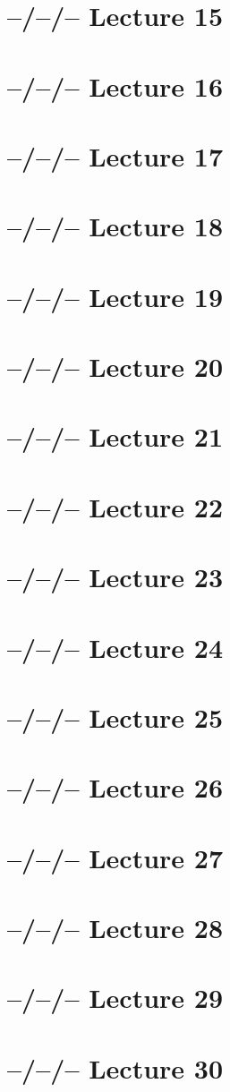 \documentclass{article}
\theoremstyle{definition}
\begin{document}
\section{--/--/-- Lecture 15}

\section{--/--/-- Lecture 16}

\section{--/--/-- Lecture 17}

\section{--/--/-- Lecture 18}

\section{--/--/-- Lecture 19}

\section{--/--/-- Lecture 20}

\section{--/--/-- Lecture 21}

\section{--/--/-- Lecture 22}

\section{--/--/-- Lecture 23}

\section{--/--/-- Lecture 24}

\section{--/--/-- Lecture 25}

\section{--/--/-- Lecture 26}

\section{--/--/-- Lecture 27}

\section{--/--/-- Lecture 28}

\section{--/--/-- Lecture 29}

\section{--/--/-- Lecture 30}
\end{document}
